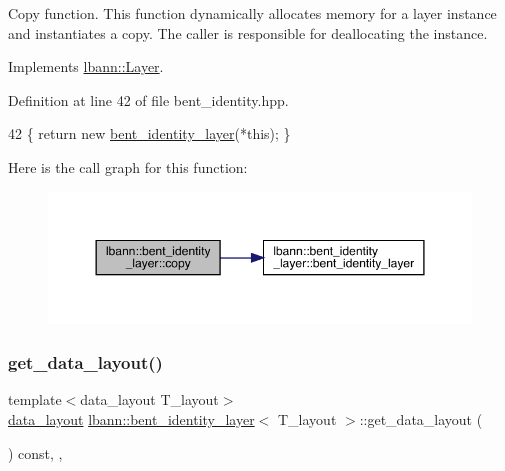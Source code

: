 Copy function. This function dynamically allocates memory for a layer instance and instantiates a copy. The caller is responsible for deallocating the instance. 

Implements \hyperlink{classlbann_1_1Layer_af420f22bbac801c85483ade84588a23f}{lbann\+::\+Layer}.



Definition at line 42 of file bent\+\_\+identity.\+hpp.


\begin{DoxyCode}
42 \{ \textcolor{keywordflow}{return} \textcolor{keyword}{new} \hyperlink{classlbann_1_1bent__identity__layer_a74743e746947316d6fa043c39c5688b8}{bent\_identity\_layer}(*\textcolor{keyword}{this}); \}
\end{DoxyCode}
Here is the call graph for this function\+:\nopagebreak
\begin{figure}[H]
\begin{center}
\leavevmode
\includegraphics[width=350pt]{classlbann_1_1bent__identity__layer_aab5919fa670a2d93045c723f7dfce5ab_cgraph}
\end{center}
\end{figure}
\mbox{\label{classlbann_1_1bent__identity__layer_a6529bc010caf29864753fef567f5e4de}} 
\subsubsection{\texorpdfstring{get\+\_\+data\+\_\+layout()}{get\_data\_layout()}}
{\footnotesize\ttfamily template$<$data\+\_\+layout T\+\_\+layout$>$ \\
\hyperlink{base_8hpp_a786677cbfb3f5677b4d84f3056eb08db}{data\+\_\+layout} \hyperlink{classlbann_1_1bent__identity__layer}{lbann\+::bent\+\_\+identity\+\_\+layer}$<$ T\+\_\+layout $>$\+::get\+\_\+data\+\_\+layout (\begin{DoxyParamCaption}{ }\end{DoxyParamCaption}) const\hspace{0.3cm}{\ttfamily [inline]}, {\ttfamily [override]}, {\ttfamily [virtual]}}

